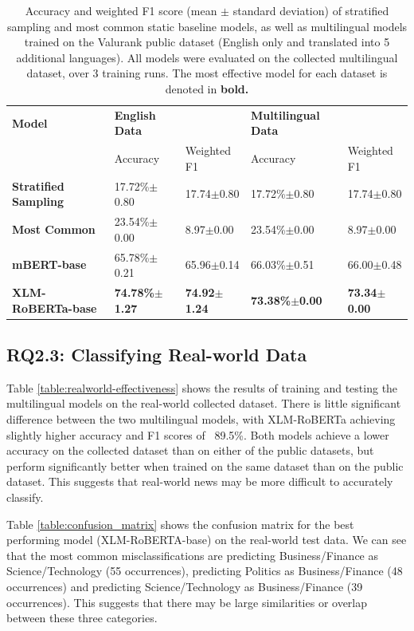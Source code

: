 \documentclass{l4proj}
\begin{document}
\begin{table}[h]
\begin{tabular}{lllll}
\hline
\textbf{Model}               & \textbf{English Data} &             & \textbf{Multilingual Data} &             \\ \cline{2-5} 
                             & Accuracy              & Weighted F1 & Accuracy                   & Weighted F1 \\ \hline
\textbf{Stratified Sampling} & 17.72\%$\pm$0.80     & 17.74$\pm$0.80 & 17.72\%$\pm$0.80     & 17.74$\pm$0.80            \\
\textbf{Most Common}         & 23.54\%$\pm$0.00     & 8.97$\pm$0.00 & 23.54\%$\pm$0.00     & 8.97$\pm$0.00 \\ \hline
\textbf{mBERT-base}          & 65.78\%$\pm$0.21     & 65.96$\pm$0.14         & 66.03\%$\pm$0.51        & 66.00$\pm$0.48         \\
\textbf{XLM-RoBERTa-base}    & \textbf{74.78\%$\pm$1.27}  & \textbf{74.92$\pm$1.24}        & \textbf{73.38\%$\pm$0.00}   & \textbf{73.34$\pm$0.00}        \\ \hline
\end{tabular}
\caption{Accuracy and weighted F1 score (mean $\pm$ standard deviation) of stratified sampling and most common static baseline models, as well as multilingual models trained on the Valurank public dataset (English only and translated into 5 additional languages). All models were evaluated on the collected multilingual dataset, over 3 training runs. The most effective model for each dataset is denoted in \textbf{bold.}}
\label{table:transferability}
\end{table}

\subsection{RQ2.3: Classifying Real-world Data}
\label{section:rq2.3}
Table \ref{table:realworld-effectiveness} shows the results of training and testing the multilingual models on the real-world collected dataset. There is little significant difference between the two multilingual models, with XLM-RoBERTa achieving slightly higher accuracy and F1 scores of ~89.5\%. Both models achieve a lower accuracy on the collected dataset than on either of the public datasets, but perform significantly better when trained on the same dataset than on the public dataset. This suggests that real-world news may be more difficult to accurately classify. \par
Table \ref{table:confusion_matrix} shows the confusion matrix for the best performing model (XLM-RoBERTA-base) on the real-world test data. We can see that the most common misclassifications are predicting Business/Finance as Science/Technology (55 occurrences), predicting Politics as Business/Finance (48 occurrences) and predicting Science/Technology as Business/Finance (39 occurrences). This suggests that there may be large similarities or overlap between these three categories.
\end{document}
